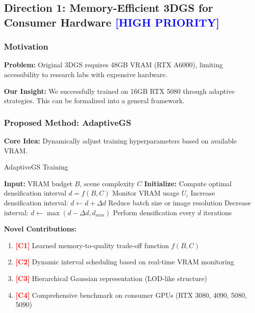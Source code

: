 \documentclass[11pt,letterpaper]{article}
\newcommand{\method}[1]{\textbf{#1}}
\newcommand{\highlight}[1]{\textcolor{blue}{\textbf{#1}}}
\newcommand{\contribution}[1]{\textcolor{red}{\textbf{[#1]}}}
\begin{document}
\subsection{Direction 1: Memory-Efficient 3DGS for Consumer Hardware \highlight{[HIGH PRIORITY]}}

\subsubsection{Motivation}

\textbf{Problem:} Original 3DGS requires 48GB VRAM (RTX A6000), limiting accessibility to research labs with expensive hardware.

\textbf{Our Insight:} We successfully trained on 16GB RTX 5080 through adaptive strategies. This can be formalized into a general framework.

\subsubsection{Proposed Method: \method{AdaptiveGS}}

\textbf{Core Idea:} Dynamically adjust training hyperparameters based on available VRAM.

\begin{algorithm}
\caption{AdaptiveGS Training}
\begin{algorithmic}
\STATE \textbf{Input:} VRAM budget $B$, scene complexity $C$
\STATE \textbf{Initialize:} Compute optimal densification interval $d = f(B, C)$
    \STATE Monitor VRAM usage $U_i$
        \STATE Increase densification interval: $d \leftarrow d + \Delta d$
        \STATE Reduce batch size or image resolution
        \STATE Decrease interval: $d \leftarrow \max(d - \Delta d, d_{min})$
    \ENDIF
    \STATE Perform densification every $d$ iterations
\ENDFOR
\end{algorithmic}
\end{algorithm}

\textbf{Novel Contributions:}
\begin{enumerate}[leftmargin=*]
    \item \contribution{C1} Learned memory-to-quality trade-off function $f(B, C)$
    \item \contribution{C2} Dynamic interval scheduling based on real-time VRAM monitoring
    \item \contribution{C3} Hierarchical Gaussian representation (LOD-like structure)
    \item \contribution{C4} Comprehensive benchmark on consumer GPUs (RTX 3080, 4090, 5080, 5090)
\end{enumerate}
\end{document}

